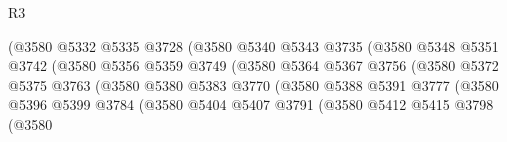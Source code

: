\begin{lexlean}{R3}
\begin{coremodule}
                                        (@3580
                                          @5332
                                          @5335
                                          @3728
                                          (@3580
                                            @5340
                                            @5343
                                            @3735
                                            (@3580
                                              @5348
                                              @5351
                                              @3742
                                              (@3580
                                                @5356
                                                @5359
                                                @3749
                                                (@3580
                                                  @5364
                                                  @5367
                                                  @3756
                                                  (@3580
                                                    @5372
                                                    @5375
                                                    @3763
                                                    (@3580
                                                      @5380
                                                      @5383
                                                      @3770
                                                      (@3580
                                                        @5388
                                                        @5391
                                                        @3777
                                                        (@3580
                                                          @5396
                                                          @5399
                                                          @3784
                                                          (@3580
                                                            @5404
                                                            @5407
                                                            @3791
                                                            (@3580
                                                              @5412
                                                              @5415
                                                              @3798
                                                              (@3580

\end{coremodule}
\end{lexlean}
